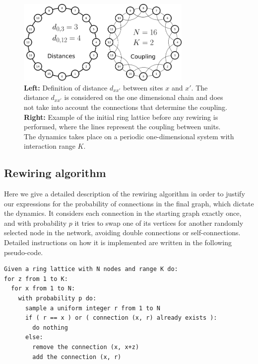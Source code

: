 \begin{figure}
  \centering
  \includegraphics[width=0.75\textwidth]{fig/ring-distance.png}
  \caption{\label{fig:ring-distance}
    \textbf{Left:} Definition of distance $d_{xx'}$ between sites $x$ and $x'$. The distance $d_{xx'}$ is considered on the one
    dimensional chain and does not take into account the connections that determine the coupling.\\
    \textbf{Right:} Example of the initial ring lattice before any rewiring is performed, where the lines represent the coupling
    between units.\\
    The dynamics takes place on a periodic one-dimensional system with interaction range $K$.
  }
\end{figure}

\subsection{Rewiring algorithm}

Here we give a detailed description of the rewiring algorithm in order to justify our expressions for the probability of connections in
the final graph, which dictate the dynamics. It considers each connection in the starting graph exactly once, and with probability $p$
it tries to swap one of its vertices for another randomly selected node in the network, avoiding double connections or
self-connections. Detailed instructions on how it is implemented are written in the following pseudo-code.

\noindent
\begin{minipage}{\linewidth}
\begin{lstlisting}
Given a ring lattice with N nodes and range K do:
for z from 1 to K:
  for x from 1 to N:
    with probability p do:
      sample a uniform integer r from 1 to N
      if ( r == x ) or ( connection (x, r) already exists ):
        do nothing
      else:
        remove the connection (x, x+z)
        add the connection (x, r)
\end{lstlisting}
\end{minipage}

